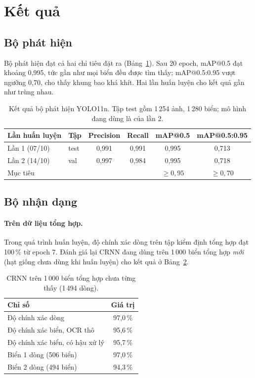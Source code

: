 \section{Kết quả}

\subsection{Bộ phát hiện}
Bộ phát hiện đạt cả hai chỉ tiêu đặt ra (Bảng~\ref{tab:det}). Sau 20 epoch, mAP@0.5 đạt khoảng 0,995, tức gần như mọi biển đều được tìm thấy; mAP@0.5:0.95 vượt ngưỡng 0,70, cho thấy khung bao khá khít. Hai lần huấn luyện cho kết quả gần như trùng nhau.

\begin{table}[H]
\centering
\caption{Kết quả bộ phát hiện YOLO11n. Tập test gồm 1\,254 ảnh, 1\,280 biển; mô hình đang dùng là của lần 2.}
\label{tab:det}
\begin{tabular}{llcccc}
\toprule
Lần huấn luyện & Tập & Precision & Recall & mAP@0.5 & mAP@0.5:0.95 \\
\midrule
Lần 1 (07/10) & test & 0,991 & 0,991 & 0,995 & 0,713 \\
Lần 2 (14/10) & val & 0,997 & 0,984 & 0,995 & 0,718 \\
\midrule
Mục tiêu & & & & $\geq 0{,}95$ & $\geq 0{,}70$ \\
\bottomrule
\end{tabular}
\end{table}

\subsection{Bộ nhận dạng}
\paragraph{Trên dữ liệu tổng hợp.} Trong quá trình huấn luyện, độ chính xác dòng trên tập kiểm định tổng hợp đạt 100\,\% từ epoch 7. Đánh giá lại CRNN đang dùng trên 1\,000 biển tổng hợp \emph{mới} (hạt giống chưa dùng khi huấn luyện) cho kết quả ở Bảng~\ref{tab:synth}.

\begin{table}[H]
\centering
\caption{CRNN trên 1\,000 biển tổng hợp chưa từng thấy (1\,494 dòng).}
\label{tab:synth}
\begin{tabular}{lc}
\toprule
Chỉ số & Giá trị \\
\midrule
Độ chính xác dòng & 97,0\,\% \\
Độ chính xác biển, OCR thô & 95,6\,\% \\
Độ chính xác biển, có hậu xử lý & 95,7\,\% \\
\quad Biển 1 dòng (506 biển) & 97,0\,\% \\
\quad Biển 2 dòng (494 biển) & 94,3\,\% \\
\bottomrule
\end{tabular}
\end{table}

